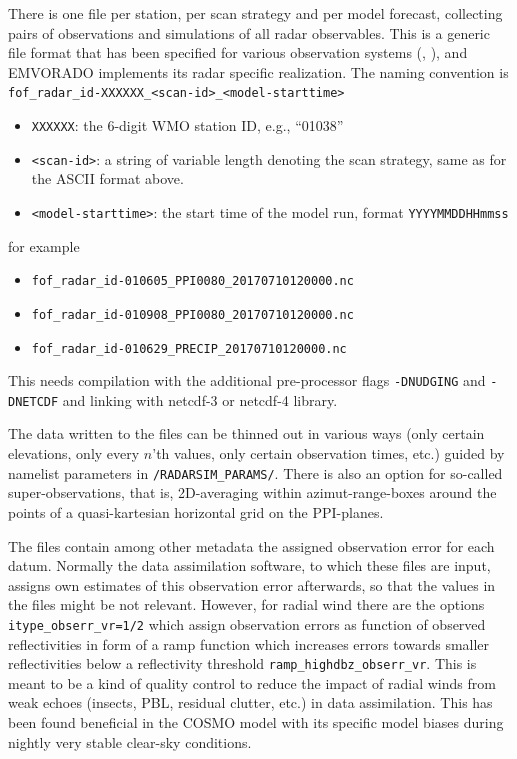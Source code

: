 \documentclass[10pt,a4paper,twoside,headinclude,footinclude,parskip=half]{scrartcl}
\newcommand{\citeNPK}[1]{\citeauthor{#1}, \citeyear{#1}}
\newcommand{\srcform}[1]{\mbox{\texttt{#1}}\xspace}%
\newcommand{\paramform}[1]{\mbox{\texttt{#1}}\xspace}%
\begin{document}
There is one file per station, per scan strategy and per model forecast, collecting pairs
  of observations and simulations of all radar observables. This is a generic file format that has been specified for
  various observation systems (\citeNPK{rhodin2012}), and EMVORADO implements its radar specific realization. The naming convention is\\[0.5em]
  \verb|fof_radar_id-XXXXXX_<scan-id>_<model-starttime>|
  \begin{itemize}
  \item \verb|XXXXXX|: the 6-digit WMO station ID, e.g., ``01038''
  \item \verb|<scan-id>|: a string of variable length denoting the scan strategy, same as for the ASCII format above.
  \item \verb|<model-starttime>|: the start time of the model run, format \verb|YYYYMMDDHHmmss|
  \end{itemize}
  for example
  \begin{itemize}
  \item \verb|fof_radar_id-010605_PPI0080_20170710120000.nc|
  \item \verb|fof_radar_id-010908_PPI0080_20170710120000.nc|
  \item \verb|fof_radar_id-010629_PRECIP_20170710120000.nc|
  \end{itemize}
  This needs compilation with the additional pre-processor flags \srcform{-DNUDGING} and \srcform{-DNETCDF} and linking with netcdf-3 or netcdf-4 library.

  The data written to the files can be thinned out in various ways (only certain elevations, only every $n$'th values, only certain observation times, etc.) guided by namelist
  parameters in \srcform{/RADARSIM_PARAMS/}. There is also an option for so-called super-observations, that is, 2D-averaging
  within azimut-range-boxes around the points of a quasi-kartesian horizontal grid on the PPI-planes.

  The files contain among other metadata the assigned observation error for each datum. Normally the data assimilation software, to
  which these files are input, assigns own estimates of this observation error afterwards, so that the values in the files might be not relevant.
  However, for radial wind there are the options \paramform{itype_obserr_vr=1/2} which assign observation errors 
  as function of observed reflectivities in form of a ramp function which increases errors towards smaller reflectivities below a
  reflectivity threshold \paramform{ramp_highdbz_obserr_vr}. This is meant to be a kind of quality control to
  reduce the impact of radial winds from weak echoes (insects, PBL, residual clutter, etc.) in data assimilation. This has
  been found beneficial in the COSMO model with its specific model biases during nightly very stable clear-sky conditions.
\end{document}
